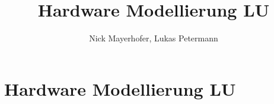 \documentclass[a4paper,12pt]{scrreprt}
\title{Hardware Modellierung LU}
\author{Nick Mayerhofer, Lukas Petermann}
\begin{document}
\tableofcontents

\renewcommand{\thesection}{\arabic{section}}

\chapter{Hardware Modellierung LU}










\end{document}
